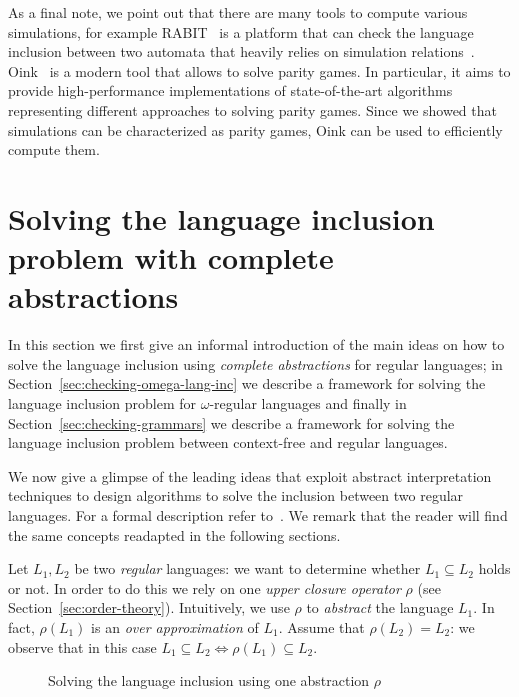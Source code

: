 As a final note, we point out that there are many tools to compute various
simulations, for example RABIT~\cite{mayrrabit} is a platform that can check the
language inclusion between two \Buchi{} automata that heavily relies on
simulation relations~\cite{abdulla2011advanced}.
Oink~\cite{Oink} is a modern tool that allows to solve parity games.
In particular, it aims to provide high-performance implementations of
state-of-the-art algorithms representing different approaches to solving parity games.
Since we showed that simulations can be characterized as parity games, Oink can
be used to efficiently compute them.



\section{Solving the language inclusion problem with complete abstractions}
\label{sec:solving-inclusion}

In this section we first give an informal introduction of the main ideas
on how to solve the language inclusion using \emph{complete abstractions}
for regular languages;
in Section~\ref{sec:checking-omega-lang-inc} we describe a framework
for solving the language inclusion problem for $\omega$-regular languages
and finally in Section~\ref{sec:checking-grammars} we describe a framework
for solving the language inclusion problem between context-free and regular
languages.

We now give a glimpse of the leading ideas that exploit abstract interpretation
techniques to design algorithms to solve the inclusion between two regular languages.
For a formal description refer to~\cite{ganty2019language}.
We remark that the reader will find the same concepts readapted in the following
sections.

Let $L_1,L_2$ be two \emph{regular} languages: we want to determine whether
$L_1 \subseteq L_2$ holds or not.
In order to do this we rely on one \emph{upper closure operator} $\rho$ (see Section~\ref{sec:order-theory}).
Intuitively, we use $\rho$ to \emph{abstract} the language $L_1$.
In fact, $\rho(L_1)$ is an \emph{over approximation} of $L_1$.
Assume that $\rho(L_2) = L_2$: we observe that in this case
$L_1 \subseteq L_2 \Longleftrightarrow \rho(L_1) \subseteq L_2$.

\begin{figure}[h]
\centering
{}
\caption{Solving the language inclusion using one abstraction $\rho$}
\end{figure}


